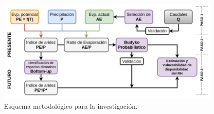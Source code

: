 \vspace{.25cm}
\begin{figure}[ht]
	\includegraphics[scale=0.5]{Images/workflow.png}
	\centering
	\caption{Esquema metodológico para la investigación.}
	\label{fig:workflow}
\end{figure}